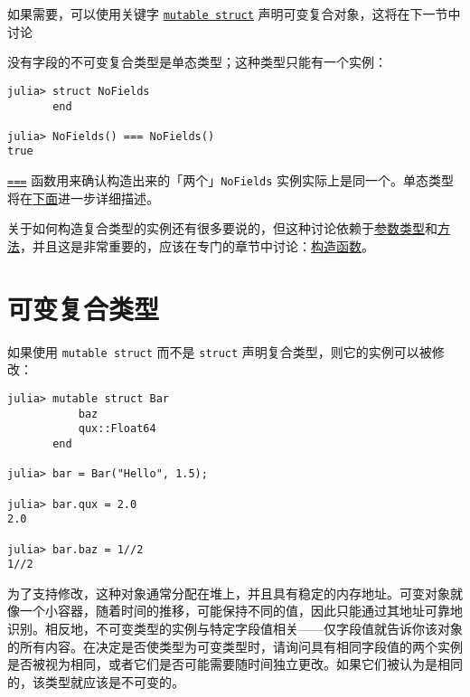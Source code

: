如果需要，可以使用关键字 \hyperlink{15383430693516362700}{\texttt{mutable struct}} 声明可变复合对象，这将在下一节中讨论



没有字段的不可变复合类型是单态类型；这种类型只能有一个实例：




\begin{verbatim}
julia> struct NoFields
       end

julia> NoFields() === NoFields()
true
\end{verbatim}



\hyperlink{7974744969331231272}{\texttt{===}} 函数用来确认构造出来的「两个」\texttt{NoFields} 实例实际上是同一个。单态类型将在\hyperlink{14008188290941962431}{下面}进一步详细描述。



关于如何构造复合类型的实例还有很多要说的，但这种讨论依赖于\hyperlink{5603543911318150609}{参数类型}和\hyperlink{3842379394166369470}{方法}，并且这是非常重要的，应该在专门的章节中讨论：\hyperlink{1489967485005487723}{构造函数}。



\hypertarget{17783679803569553227}{}


\section{可变复合类型}



如果使用 \texttt{mutable struct} 而不是 \texttt{struct} 声明复合类型，则它的实例可以被修改：




\begin{verbatim}
julia> mutable struct Bar
           baz
           qux::Float64
       end

julia> bar = Bar("Hello", 1.5);

julia> bar.qux = 2.0
2.0

julia> bar.baz = 1//2
1//2
\end{verbatim}



为了支持修改，这种对象通常分配在堆上，并且具有稳定的内存地址。可变对象就像一个小容器，随着时间的推移，可能保持不同的值，因此只能通过其地址可靠地识别。相反地，不可变类型的实例与特定字段值相关——仅字段值就告诉你该对象的所有内容。在决定是否使类型为可变类型时，请询问具有相同字段值的两个实例是否被视为相同，或者它们是否可能需要随时间独立更改。如果它们被认为是相同的，该类型就应该是不可变的。



